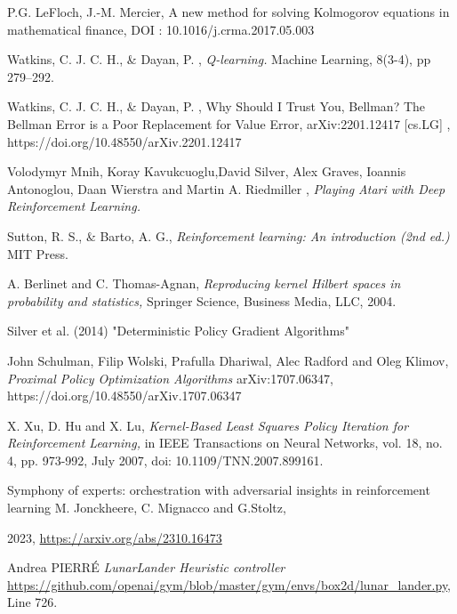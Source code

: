 \documentclass[
]{article}
\numberwithin{equation}{section}
\begin{document}
\begin{thebibliography}{1}
{\sc P.G. LeFloch, J.-M. Mercier, }
A new method for solving Kolmogorov equations in mathematical finance,
DOI : 10.1016/j.crma.2017.05.003

{\sc Watkins, C. J. C. H., \& Dayan, P. }, 
{\sl Q-learning.}
Machine Learning, 8(3-4), pp 279–292.

{\sc Watkins, C. J. C. H., \& Dayan, P. }, 
Why Should I Trust You, Bellman? The Bellman Error is a Poor Replacement for Value Error, arXiv:2201.12417 [cs.LG]
, https://doi.org/10.48550/arXiv.2201.12417


{\sc Volodymyr Mnih, Koray Kavukcuoglu,David Silver, Alex Graves, Ioannis Antonoglou, Daan Wierstra and Martin A. Riedmiller }, 
{\sl Playing Atari with Deep Reinforcement Learning.} 

{\sc Sutton, R. S., \& Barto, A. G.}, 
{\sl Reinforcement learning: An introduction (2nd ed.)}
MIT Press.

{\sc A. Berlinet and C. Thomas-Agnan,}
{\it Reproducing kernel Hilbert spaces in probability and statistics,}
Springer Science, Business Media, LLC, 2004.

{
Silver et al. (2014) "Deterministic Policy Gradient Algorithms"
}

{\sc John Schulman, Filip Wolski, Prafulla Dhariwal, Alec Radford and Oleg Klimov}, 
{\sl Proximal Policy Optimization Algorithms}
 arXiv:1707.06347, 
https://doi.org/10.48550/arXiv.1707.06347



{\sc X. Xu, D. Hu and X. Lu,}
{\it Kernel-Based Least Squares Policy Iteration for Reinforcement Learning,}
in IEEE Transactions on Neural Networks, vol. 18, no. 4, pp. 973-992, July 2007, doi: 10.1109/TNN.2007.899161.

Symphony of experts: orchestration with adversarial insights in
reinforcement learning
{\sc M. Jonckheere, C. Mignacco and G.Stoltz,}

2023, \url{https://arxiv.org/abs/2310.16473}

{\sc Andrea PIERRÉ}
{\it LunarLander Heuristic controller}
\url{https://github.com/openai/gym/blob/master/gym/envs/box2d/lunar_lander.py}, Line 726. 



\end{thebibliography}
\end{document}
